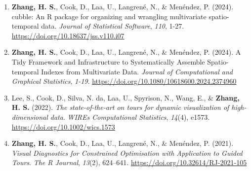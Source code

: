 \documentclass[10pt,a4paper]{article} %
\begin{document}


\vspace{-1em}
\begin{enumerate}[itemsep=0.1em]

    \item \textbf{Zhang, H. S.}, Cook, D., Laa, U., Langren\'e, N., \& Men\'endez, P. (2024). 
    cubble: An R package for organizing and wrangling multivariate spatio-temporal data. 
    \emph{Journal of Statistical Software}, \emph{110}, 1-27. \url{https://doi.org/10.18637/jss.v110.i07}

    \item \textbf{Zhang, H. S.}, Cook, D., Laa, U., Langren\'e, N., \& Men\'endez, P. (2024). 
    A Tidy Framework and Infrastructure to Systematically Assemble Spatio-temporal Indexes 
    from Multivariate Data. \emph{Journal of Computational and Graphical Statistics}, 
    \emph{1-19}. \url{https://doi.org/10.1080/10618600.2024.2374960}
    
    \item Lee, S., Cook, D., Silva, N. da, Laa, U., Spyrison, N., Wang, E., \& 
    \textbf{Zhang, H. S.} (2022). \textit{The state-of-the-art on tours for 
    dynamic visualization of high-dimensional data}. \emph{WIREs Computational Statistics}, 
    \emph{14}(4), e1573. \url{https://doi.org/10.1002/wics.1573}
    
    \item \textbf{Zhang, H. S.}, Cook, D., Laa, U., Langren\'e, N., \& Men\'endez, P. (2021). 
    \textit{Visual Diagnostics for Constrained Optimisation with Application to Guided Tours}. 
    \emph{The R Journal}, \emph{13}(2), 624--641. \url{https://doi.org/10.32614/RJ-2021-105}
    

\end{enumerate}
\end{document}
